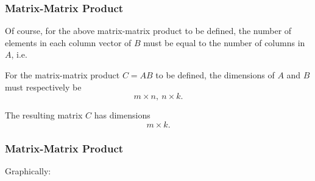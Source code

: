 \begin{frame}
  \frametitle{Matrix-Matrix Product}
  Of course, for the above matrix-matrix product to be defined, the number of elements in each column vector of $B$ must be equal to the number of columns in $A$, i.e.
  \begin{presentation_definition}
    For the matrix-matrix product $C=AB$ to be defined, the dimensions of $A$ and $B$ must respectively be
    \begin{equation*}
      m\times n,\ n\times k.
    \end{equation*}

    The resulting matrix $C$ has dimensions
    \begin{equation*}
      m\times k.
    \end{equation*}
  \end{presentation_definition}
\end{frame}

\begin{frame}
  \frametitle{Matrix-Matrix Product}
  Graphically:
  \begin{figure}
    \centering
  \end{figure}
\end{frame}

